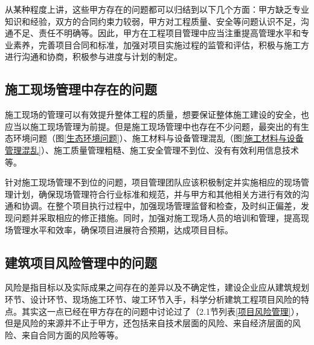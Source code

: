 	从某种程度上讲，这些甲方存在的问题都可以归结到以下几个方面：甲方缺乏专业知识和经验，双方的合同约束力较弱，甲方对工程质量、安全等问题认识不足，沟通不足、责任不明确等。因此，甲方在工程项目管理中应当注重提高管理水平和专业素养，完善项目合同和标准，加强对项目实施过程的监管和评估，积极与施工方进行沟通和协商，积极参与进度与计划的制定。
	
	\subsection{施工现场管理中存在的问题~\cite{ZhangHuWeiJianZhuGongChengXiangMuGuanLiZhongDeShiGongXianChangGuanLiYouHuaDuiCeYanJiu2023}~}
	
	施工现场的管理可以有效提升整体工程的质量，想要保证整体施工建设的安全，也应当以施工现场管理为前提。但是施工现场管理中也存在不少问题，最突出的有生态环境问题（图\ref{生态环境问题}）、施工材料与设备管理混乱（图\ref{施工材料与设备管理混乱}）、施工质量管理粗糙、施工安全管理不到位、没有有效利用信息技术等。
	
	\begin{figure}[H]
		\centering
		\caption{}
	\end{figure}
	
	针对施工现场管理不到位的问题，项目管理团队应该积极制定并实施相应的现场管理计划，确保现场管理符合行业标准和规范，并与甲方和其他相关方进行有效的沟通和协调。在整个项目执行过程中，加强现场管理监督和检查，及时纠正偏差，发现问题并采取相应的修正措施。同时，加强对施工现场人员的培训和管理，提高现场管理水平和效率，确保项目进展符合预期，达成项目目标。
	
	\subsection{建筑项目风险管理中的问题~\cite{ZouJianMingQianTanJianZhuGongChengXiangMuGuanLiFengXianJiQiFangFanCuoShi2023}~}
	
	风险是指目标以及实际成果之间存在的差异以及不确定性，建设企业应从建筑规划环节、设计环节、现场施工环节、竣工环节入手，科学分析建筑工程项目风险的特点。其实这一点已经在甲方存在的问题中讨论过了（2.1节列表\ref{项目风险管理}），但是风险的来源并不止于甲方，还包括来自技术层面的风险、来自经济层面的风险、来自合同方面的风险等等。
	
